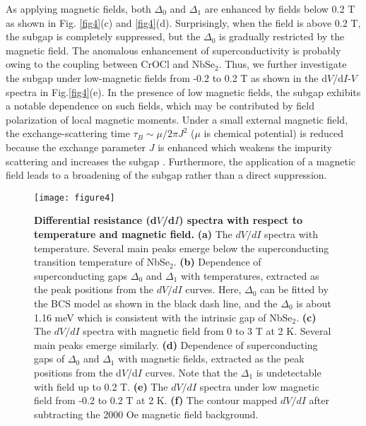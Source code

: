 \documentclass[%
 reprint,
superscriptaddress,
 amsmath,amssymb,
 aps,
]{revtex4-2}
\begin{document}
As applying magnetic fields, both $\Delta_0$ and $\Delta_1$ are enhanced by fields below 0.2 T as shown in Fig. \ref{fig4}(c) and \ref{fig4}(d). Surprisingly, when the field is above 0.2 T, the subgap is completely suppressed, but the $\Delta_0$ is gradually restricted by the magnetic field. The anomalous enhancement of superconductivity is probably owing to the coupling between CrOCl and NbSe$_2$. Thus, we further investigate the subgap under low-magnetic fields from -0.2 to 0.2 T as shown in the d$V$/d$I$-$V$ spectra in Fig.\ref{fig4}(e). In the presence of low magnetic fields, the subgap exhibits a notable dependence on such fields, which may be contributed by field polarization of local magnetic moments. Under a small external magnetic field, the exchange-scattering time $\tau _B \sim \mu/2\pi J^2$ ($\mu$ is chemical potential) is reduced because the exchange parameter $J$ is enhanced which weakens the impurity scattering and increases the subgap \cite{MBT}. Furthermore, the application of a magnetic field leads to a broadening of the subgap rather than a direct suppression.


\begin{figure*}[b]
\centering
\texttt{[image: figure4]}
\caption{{\label{fig4} \textbf{Differential resistance (d$V$/d$I$) spectra with respect to temperature and magnetic field.} \textbf{(a)} The $dV/dI$ spectra with temperature. Several main peaks emerge below the superconducting transition temperature of NbSe$_2$. \textbf{(b)} Dependence of superconducting gaps $\Delta_0$ and $\Delta_1$ with temperatures, extracted as the peak positions from the $dV/dI$ curves. Here, $\Delta_0$ can be fitted by the BCS model as shown in the black dash line, and the $\Delta_0$ is about 1.16 meV which is consistent with the intrinsic gap of NbSe$_2$. \textbf{(c)} The $dV/dI$ spectra with magnetic field from 0 to 3 T at 2 K. Several main peaks emerge similarly. \textbf{(d)} Dependence of superconducting gaps of $\Delta_0$ and $\Delta_1$ with magnetic fields, extracted as the peak positions from the d$V$/d$I$ curves. Note that the $\Delta_1$ is undetectable with field up to 0.2 T. \textbf{(e)} The $dV/dI$ spectra under low magnetic field from -0.2 to 0.2 T at 2 K. \textbf{(f)} The contour mapped $dV/dI$ after subtracting the 2000 Oe magnetic field background.}}
\label{fig:fig4}
\end{figure*}
\end{document}
